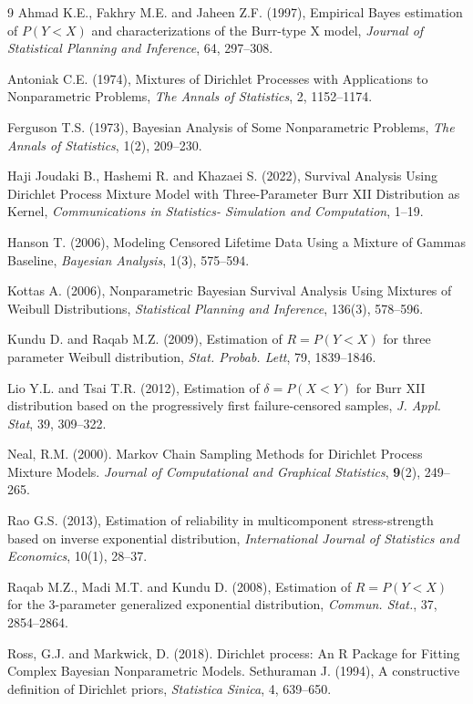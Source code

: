 \documentclass[twoside]{article}
\begin{document}
\begin{thebibliography}{9}
Ahmad K.E., Fakhry M.E. and Jaheen Z.F. (1997), Empirical Bayes estimation of \(P(Y < X)\) and characterizations of the Burr-type X model, {\it Journal of Statistical Planning and Inference}, 64, 297--308.

Antoniak C.E. (1974), Mixtures of Dirichlet Processes with Applications to Nonparametric Problems, {\it The Annals of Statistics}, 2, 1152--1174.

Ferguson T.S. (1973), Bayesian Analysis of Some Nonparametric Problems, {\it The Annals of Statistics}, 1(2), 209--230.

Haji Joudaki B., Hashemi R. and Khazaei S. (2022), Survival Analysis Using Dirichlet Process Mixture Model with Three-Parameter Burr XII Distribution as Kernel, {\it Communications in Statistics- Simulation and Computation}, 1--19.

Hanson T. (2006), Modeling Censored Lifetime Data Using a Mixture of Gammas Baseline, {\it Bayesian Analysis}, 1(3), 575--594.

Kottas A. (2006), Nonparametric Bayesian Survival Analysis Using Mixtures of Weibull Distributions, {\it Statistical Planning and Inference}, 136(3), 578--596.

Kundu D. and Raqab M.Z. (2009), Estimation of \(R = P(Y < X)\) for three parameter Weibull distribution, {\it Stat. Probab. Lett}, 79, 1839--1846.

Lio Y.L. and Tsai T.R. (2012), Estimation of \(\delta = P(X < Y)\) for Burr XII distribution based on the progressively first failure-censored samples, {\it J. Appl. Stat}, 39, 309--322.

Neal, R.M. (2000). Markov Chain Sampling Methods for Dirichlet Process Mixture Models. \textit{Journal of Computational and Graphical Statistics}, \textbf{9}(2), 249--265.

Rao G.S. (2013), Estimation of reliability in multicomponent stress-strength based on inverse exponential distribution, {\it International Journal of Statistics and Economics}, 10(1), 28--37.

Raqab M.Z., Madi M.T. and Kundu D. (2008), Estimation of \(R = P(Y < X)\) for the 3-parameter generalized exponential distribution, {\it Commun. Stat.}, 37, 2854--2864.

Ross, G.J. and Markwick, D. (2018). Dirichlet process: An R Package for Fitting Complex Bayesian Nonparametric Models.
Sethuraman J. (1994), A constructive definition of Dirichlet priors, {\it Statistica Sinica}, 4, 639--650.

\end{thebibliography}
\end{document}
